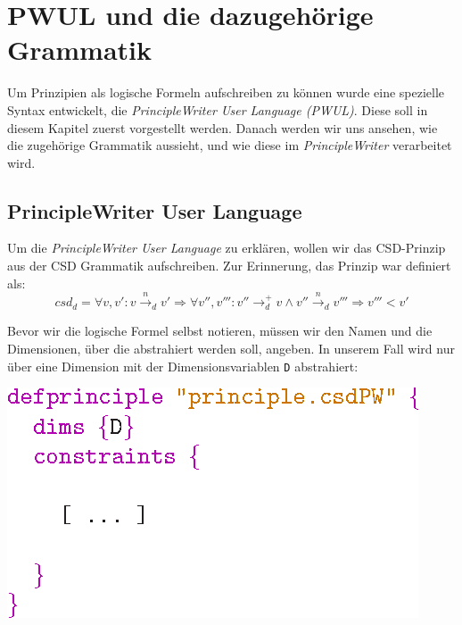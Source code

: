 \section{PWUL und die dazugeh\"orige Grammatik}

Um Prinzipien als logische Formeln aufschreiben zu k\"onnen wurde eine
spezielle Syntax entwickelt, die {\it PrincipleWriter User Language
  (PWUL)}. Diese soll in diesem Kapitel zuerst vorgestellt werden.
Danach werden wir uns ansehen, wie die zugeh\"orige Grammatik
aussieht, und wie diese im {\it PrincipleWriter} verarbeitet wird.

\subsection{PrincipleWriter User Language}

Um die {\it PrincipleWriter User Language} zu erkl\"aren, wollen wir
das CSD-Prinzip aus der CSD Grammatik aufschreiben. Zur Erinnerung,
das Prinzip war definiert als:
$$ 
csd_d  =  \forall v, v': 
       v \overset{n}{\rightarrow}_d v' \Rightarrow \forall
      v'', v''': v'' \rightarrow^+_d v \wedge v''
      \overset{n}{\rightarrow}_d v''' \Rightarrow v''' < v' 
$$

Bevor wir die logische Formel selbst notieren, m\"ussen wir den Namen
und die Dimensionen, \"uber die abstrahiert werden soll, angeben. In
unserem Fall wird nur \"uber eine Dimension mit der
Dimensionsvariablen {\tt D} abstrahiert:
\begin{center}
\includegraphics[scale=1.0]{eps/defprinciplecsd}
\end{center}
    


